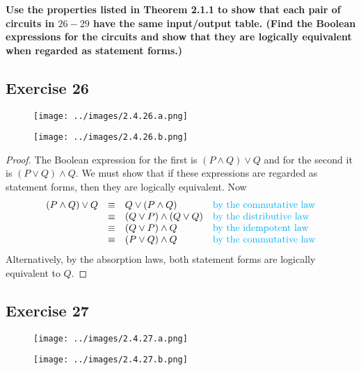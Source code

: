 \documentclass[14pt]{extarticle}
\begin{document}
{\bf \color{cyan} Use the properties listed in Theorem 2.1.1 to show that each pair of circuits in $26-29$ have the same input/output table. (Find the Boolean expressions for the circuits and show that they are logically equivalent when regarded as statement forms.)}

\subsection{Exercise 26}
\begin{figure}[ht!]
    \centering
    \texttt{[image: ../images/2.4.26.a.png]}
\end{figure}

\begin{figure}[ht!]
    \centering
    \texttt{[image: ../images/2.4.26.b.png]}
\end{figure}

\begin{proof}
    The Boolean expression for the first is $(P \wedge Q) \vee Q$ and for the second it is $(P \vee Q) \wedge Q$. We must show that if these expressions are regarded as statement forms, then they are logically equivalent. Now
    $$ \begin{array}{rcll}
            (P \wedge Q) \vee Q & \equiv & Q \vee (P \wedge Q)          & \text{\color{cyan}by the commutative law}  \\
                                & \equiv & (Q \vee P) \wedge (Q \vee Q) & \text{\color{cyan}by the distributive law}
            \\ & \equiv & (Q \vee P) \wedge Q & \text{\color{cyan}by the idempotent law} \\
                                & \equiv & (P \vee Q) \wedge Q          & \text{\color{cyan}by the commutative law}  \\
        \end{array}
    $$
    Alternatively, by the absorption laws, both statement forms are logically equivalent to $Q$.
\end{proof}

\subsection{Exercise 27}
\begin{figure}[ht!]
    \centering
    \texttt{[image: ../images/2.4.27.a.png]}
\end{figure}

\begin{figure}[ht!]
    \centering
    \texttt{[image: ../images/2.4.27.b.png]}
\end{figure}
\end{document}
